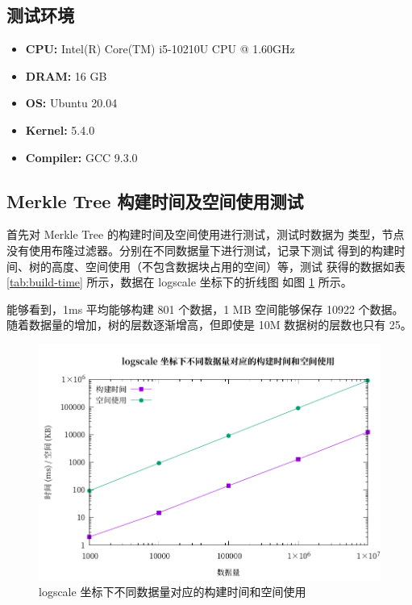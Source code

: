 \documentclass{mydoc}
\begin{document}
\subsection{测试环境}

\begin{itemize}
  \item \textbf{CPU:} Intel(R) Core(TM) i5-10210U CPU @ 1.60GHz
  \item \textbf{DRAM:} 16 GB
  \item \textbf{OS:} Ubuntu 20.04
  \item \textbf{Kernel:} 5.4.0
  \item \textbf{Compiler:} GCC 9.3.0
\end{itemize}

\subsection{Merkle Tree 构建时间及空间使用测试}

首先对 Merkle Tree 的构建时间及空间使用进行测试，测试时数据为 
类型，节点没有使用布隆过滤器。分别在不同数据量下进行测试，记录下测试
得到的构建时间、树的高度、空间使用（不包含数据块占用的空间）等，测试
获得的数据如表 \ref{tab:build-time} 所示，数据在 logscale 坐标下的折线图
如图 \ref{fig:build-time} 所示。

能够看到，1ms 平均能够构建 801 个数据，1 MB 空间能够保存 10922 个数据。
随着数据量的增加，树的层数逐渐增高，但即使是 10M 数据树的层数也只有 25。

\begin{figure}[htbp]
  \centering
  \includegraphics{figure/build-time.pdf}
  \caption{logscale 坐标下不同数据量对应的构建时间和空间使用}%
  \label{fig:build-time}
\end{figure}
\end{document}
